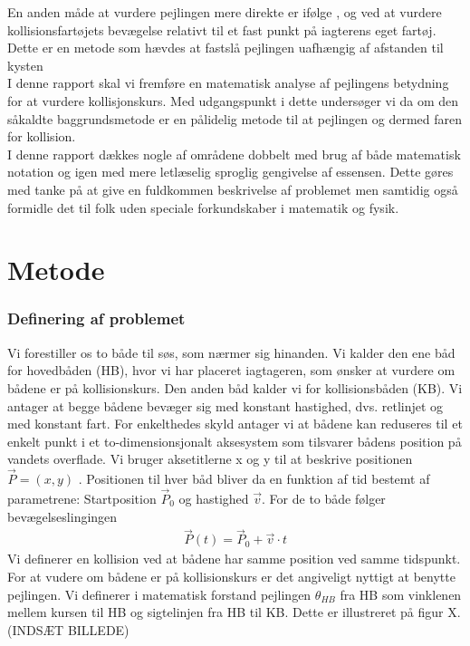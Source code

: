 \documentclass[%
 reprint,
nofootinbib,
aps,
]{revtex4-1}
\begin{document}
En anden måde at vurdere pejlingen mere direkte er ifølge \cite{studienoter}, \cite{retsinformation} og \cite{groensund} ved at vurdere kollisionsfartøjets bevægelse relativt til et fast punkt på iagterens eget fartøj. Dette er en metode som hævdes at fastslå pejlingen uafhængig af afstanden til kysten \\
I denne rapport skal vi fremføre en matematisk analyse af pejlingens betydning for at vurdere kollisjonskurs. Med udgangspunkt i dette undersøger vi da om den såkaldte baggrundsmetode er en pålidelig metode til at pejlingen og dermed faren for kollision. \\
I denne rapport dækkes nogle af områdene dobbelt med brug af både matematisk notation og igen med mere letlæselig sproglig gengivelse af essensen. Dette gøres med tanke på at give en fuldkommen beskrivelse af problemet men samtidig også formidle det til folk uden speciale  forkundskaber i matematik og fysik.



\section{Metode}
\subsubsection{Definering af problemet}
Vi forestiller os to både til søs, som nærmer sig hinanden. Vi kalder den ene båd for hovedbåden (HB), hvor vi har placeret iagtageren, som ønsker at vurdere om bådene er på kollisionskurs. Den anden båd kalder vi for kollisionsbåden (KB). Vi antager at begge bådene bevæger sig med konstant hastighed, dvs. retlinjet og med konstant fart. For enkelthedes skyld antager vi at bådene kan reduseres til et enkelt punkt i et to-dimensionsjonalt aksesystem som tilsvarer bådens position på vandets overflade. Vi bruger aksetitlerne x og y til at beskrive positionen $\vec{P} = (x, y)$ . Positionen til hver båd bliver da en funktion af tid bestemt af parametrene: Startposition $\vec{P}_0$ og hastighed $\vec{v}$. For de to både følger bevægelseslingingen
\begin{align*}
  \vec{P}(t) =  \vec{P}_0 + \vec{v}\cdot t
\end{align*}
Vi definerer en kollision ved at bådene har samme position ved samme tidspunkt. \\
For at vudere om bådene er på kollisionskurs er det angiveligt nyttigt at benytte pejlingen. Vi definerer i matematisk forstand pejlingen $\theta_{HB}$ fra HB som vinklenen mellem kursen til HB og sigtelinjen fra HB til KB. Dette er illustreret på figur X. (INDSÆT BILLEDE)
\end{document}
